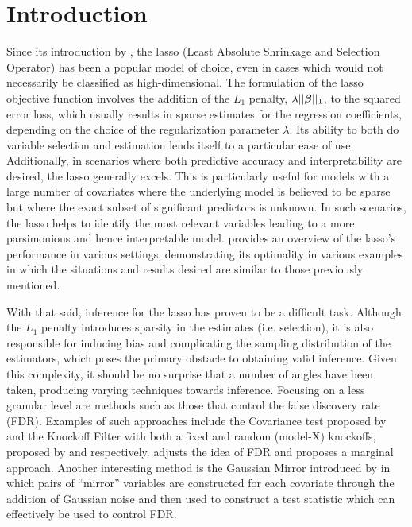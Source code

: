 \section{Introduction}


Since its introduction by \cite{Tibshirani1996}, the lasso (Least Absolute Shrinkage and Selection Operator) has been a popular model of choice, even in cases which would not necessarily be classified as high-dimensional. The formulation of the lasso objective function involves the addition of the $L_1$ penalty, $\lambda||\boldsymbol{\beta}||_1$, to the squared error loss, which usually results in sparse estimates for the regression coefficients, depending on the choice of the regularization parameter $\lambda$. Its ability to both do variable selection and estimation lends itself to a particular ease of use. Additionally, in scenarios where both predictive accuracy and interpretability are desired, the lasso generally excels. This is particularly useful for models with a large number of covariates where the underlying model is believed to be sparse but where the exact subset of significant predictors is unknown. In such scenarios, the lasso helps to identify the most relevant variables leading to a more parsimonious and hence interpretable model. \cite{HTF2009} provides an overview of the lasso's performance in various settings, demonstrating its optimality in various examples in which the situations and results desired are similar to those previously mentioned. 

With that said, inference for the lasso has proven to be a difficult task. Although the $L_1$ penalty introduces sparsity in the estimates (i.e. selection), it is also responsible for inducing bias and complicating the sampling distribution of the estimators, which poses the primary obstacle to obtaining valid inference. Given this complexity, it should be no surprise that a number of angles have been taken, producing varying techniques towards inference. Focusing on a less granular level are methods such as those that control the false discovery rate (FDR). Examples of such approaches include the Covariance test proposed by \cite{Lockhart2014} and the Knockoff Filter with both a fixed and random (model-X) knockoffs, proposed by \cite{Candes2015} and \cite{Candes2018} respectively. \cite{Breheny2019} adjusts the idea of FDR and proposes a marginal approach. Another interesting method is the Gaussian Mirror introduced by \cite{Xing2023} in which pairs of ``mirror'' variables are constructed for each covariate through the addition of Gaussian noise and then used to construct a test statistic which can effectively be used to control FDR.

